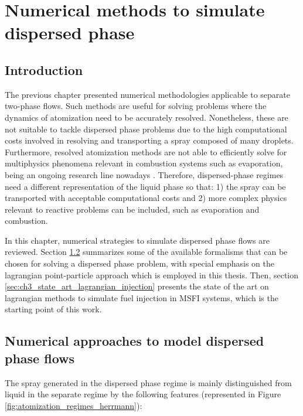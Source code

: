 \chapter{Numerical methods to simulate dispersed phase}
	\label{ch3:disperse_phase_methods}

\section{Introduction}

The previous chapter presented numerical methodologies applicable to separate two-phase flows. Such methods are useful for solving problems where the dynamics of atomization need to be accurately resolved. Nonetheless, these are not suitable to tackle dispersed phase problems due to the high computational costs involved in resolving and transporting a spray composed of many droplets. Furthermore, resolved atomization methods are not able to efficiently solve for multiphysics phenomena relevant in combustion systems such as evaporation, being an ongoing research line nowadays . Therefore, dispersed-phase regimes need a different representation of the liquid phase so that: 1) the spray can be transported with acceptable computational costs and 2) more complex physics relevant to reactive problems can be included, such as evaporation and combustion.

In this chapter, numerical strategies to simulate dispersed phase flows are reviewed. Section \ref{sec:ch3_numerical_approaches_dispersed_phase} summarizes some of the available formalisms that can be chosen for solving a dispersed phase problem, with special emphasis on the lagrangian point-particle approach which is employed in this thesis. Then, section \ref{sec:ch3_state_art_lagrangian_injection} presents the state of the art on lagrangian methods to simulate fuel injection in MSFI systems, which is the starting point of this work.

\section{Numerical approaches to model dispersed phase flows}
\label{sec:ch3_numerical_approaches_dispersed_phase}


The spray generated in the dispersed phase regime is mainly distinguished from liquid in the separate regime by the following features (represented in Figure \ref{fig:atomization_regimes_herrmann}):


